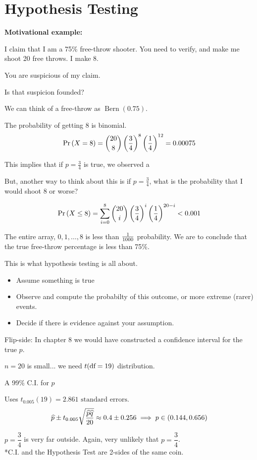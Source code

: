 \chapter{Hypothesis Testing}

\nl \textbf{Motivational example:}

\nl I claim that I am a 75\% free-throw shooter. You need to verify, and make me shoot 20 free throws. \color{red}I make 8.\color{black}

\nnl You are suspicious of my claim.

\nl Is that suspicion founded?

\nl We can think of a free-throw as $\operatorname{Bern}(0.75)$.

\nl The probability of getting 8 is binomial.
    $$\P{X = 8} = \binom{20}{8} \pars{\frac{3}{4}}^8 \pars{\frac{1}{4}}^{12} = 0.00075$$

\nl This implies that if $p = \frac{3}{4}$ is true, we observed a 

\nl But, another way to think about this is if $p = \frac{3}{4}$, what is the probability that I would shoot 8 or worse?

$$\P{X \leq 8} = \sum_{i=0}^8 \binom{20}{i} \pars{\frac{3}{4}}^{i} \pars{\frac{1}{4}}^{20-i} < 0.001$$

\nl The entire array, $0, 1, \dots, 8$ is less than $\over{1000}$ probability. We are  to conclude that the true free-throw percentage is less than 75\%.

\nl This is what hypothesis testing is all about.
\begin{itemize}
    \item Assume something is true
    \item Observe and compute the probabilty of this outcome, or more extreme (rarer) events.
    \item Decide if there is evidence against your assumption.
\end{itemize}

\nl Flip-side: In chapter 8 we would have constructed a confidence interval for the true $p$.

\nl $n = 20$ is small... we need $t(\text{df} = 19)$ distribution.

\nl A 99\% C.I. for $p$

\nl Uses $t_{0.005}(19) = 2.861 \text{ standard errors}$.
$$\widehat{p} \pm t_{0.005}\sqrt{\frac{\widehat{p}\widehat{q}}{20}} \approx 0.4 \pm 0.256 \implies p \in (0.144, 0.656)$$

\nl \color{red} $p = \dfrac{3}{4}$ is very far outside.\color{black} \hspace{.5mm} Again, very unlikely that $p = \dfrac{3}{4}$.\\
*C.I. and the Hypothesis Test are 2-sides of the same coin.

